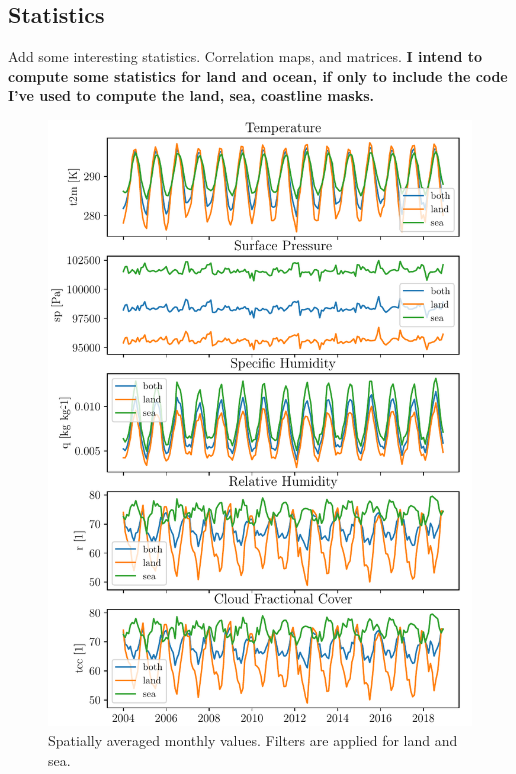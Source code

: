 \subsection{Statistics}
Add some interesting statistics. Correlation maps, and matrices.
\textbf{I intend to compute some statistics for land and ocean, if only to include the code I've used to compute the land, sea, coastline masks.}

\begin{figure}
    \centering
    \includegraphics{python_figs/monthly_means.pdf}
    \caption{Spatially averaged monthly values. Filters are applied for land and sea.}
    \label{fig:monthly_mean_ts_vars}
\end{figure}


